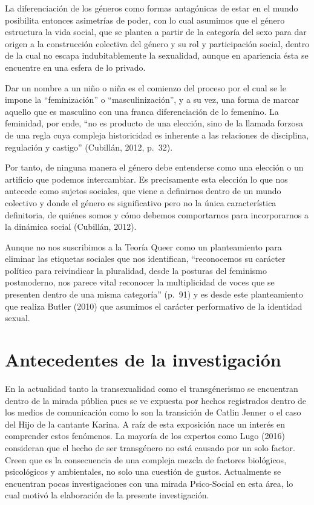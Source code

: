 La diferenciación de los géneros como formas antagónicas de estar en el mundo
posibilita entonces asimetrías de poder, con lo cual asumimos que el género
estructura la vida social, que se plantea a partir de la categoría del sexo para
dar origen a la construcción colectiva del género y su rol y participación
social, dentro de la cual no escapa indubitablemente la sexualidad, aunque en
apariencia ésta se encuentre en una esfera de lo privado.

Dar un nombre a un niño o niña es el comienzo del proceso por el cual se le
impone la “feminización” o “masculinización”, y a su vez, una forma de marcar
aquello que es masculino con una franca diferenciación de lo femenino.
La feminidad, por ende, “no es producto de una elección, sino de la llamada
forzosa de una regla cuya compleja historicidad es inherente a las relaciones de
disciplina, regulación y castigo” (Cubillán, 2012, p.~32).

Por tanto, de ninguna manera el género debe entenderse como una elección o un
artificio que podemos intercambiar.
Es precisamente esta elección lo que nos antecede como sujetos sociales, que
viene a definirnos dentro de un mundo colectivo y donde el género es
significativo pero no la única característica definitoria, de quiénes somos y
cómo debemos comportarnos para incorporarnos a la dinámica social (Cubillán,
2012).

Aunque no nos suscribimos a la Teoría Queer como un planteamiento para eliminar
las etiquetas sociales que nos identifican, “reconocemos su carácter político
para reivindicar la pluralidad, desde la posturas del feminismo postmoderno, nos
parece vital reconocer la multiplicidad de voces que se presenten dentro de
una misma categoría” (p.~91) y es desde este planteamiento que realiza Butler
(2010) que asumimos el carácter performativo de la identidad sexual.

\section{Antecedentes de la investigación}
En la actualidad tanto la transexualidad como el transgénerismo se encuentran
dentro de la mirada pública pues se ve expuesta por hechos registrados dentro de
los medios de comunicación como lo son la transición de Catlin Jenner o el caso
del Hijo de la cantante Karina.
A raíz de esta exposición nace un interés en comprender estos fenómenos.
La mayoría de los expertos como Lugo (2016) consideran que el hecho de ser
transgénero no está causado por un solo factor.
Creen que es la consecuencia de una compleja mezcla de factores biológicos,
psicológicos y ambientales, no solo una cuestión de gustos.
Actualmente se encuentran pocas investigaciones con una mirada Psico-Social en
esta área, lo cual motivó la elaboración de la presente investigación.

